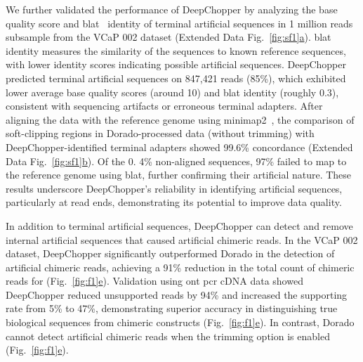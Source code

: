 \documentclass[pdflatex, sn-mathphys-num, lineno]{sn-jnl}%
\newcommand{\figref}[2]{Fig.~\hyperref[#1]{\ref*{#1}#2}}
\newcommand{\edfigref}[2]{Extended Data Fig.~\hyperref[#1]{\ref*{#1}#2}}
\theoremstyle{thmstyleone}%
\theoremstyle{thmstyletwo}%
\theoremstyle{thmstylethree}%
\begin{document}
We further validated the performance of DeepChopper by analyzing the base quality score and \gls{blat}~\cite{kent2002blat} identity of terminal artificial sequences in 1 million reads subsample from the VCaP 002 dataset (\edfigref{fig:sf1}{a}).
\gls{blat} identity measures the similarity of the sequences to known reference sequences, with lower identity scores indicating possible artificial sequences.
DeepChopper predicted terminal artificial sequences on 847,421 reads (85\%), which exhibited lower average base quality scores (around 10) and \gls{blat} identity (roughly 0.3), consistent with sequencing artifacts or erroneous terminal adapters.
After aligning the data with the reference genome using minimap2~\cite{li2018minimap2}, the comparison of soft-clipping regions in Dorado-processed data (without trimming) with DeepChopper-identified terminal adapters showed 99.6\% concordance (\edfigref{fig:sf1}{b}).
Of the 0. 4\% non-aligned sequences, 97\% failed to map to the reference genome using \gls{blat}, further confirming their artificial nature.
These results underscore DeepChopper's reliability in identifying artificial sequences, particularly at read ends, demonstrating its potential to improve data quality.

In addition to terminal artificial sequences, DeepChopper can detect and remove internal artificial sequences that caused artificial chimeric reads.
In the VCaP 002 dataset, DeepChopper significantly outperformed Dorado in the detection of artificial chimeric reads, achieving a 91\% reduction in the total count of chimeric reads for (\figref{fig:f1}{e}).
Validation using \gls{ont} \gls{pcr} cDNA data showed DeepChopper reduced unsupported reads by 94\% and increased the supporting rate from 5\% to 47\%, demonstrating superior accuracy in distinguishing true biological sequences from chimeric constructs (\figref{fig:f1}{e}).
In contrast, Dorado cannot detect artificial chimeric reads when the trimming option is enabled (\figref{fig:f1}{e}).
\end{document}
